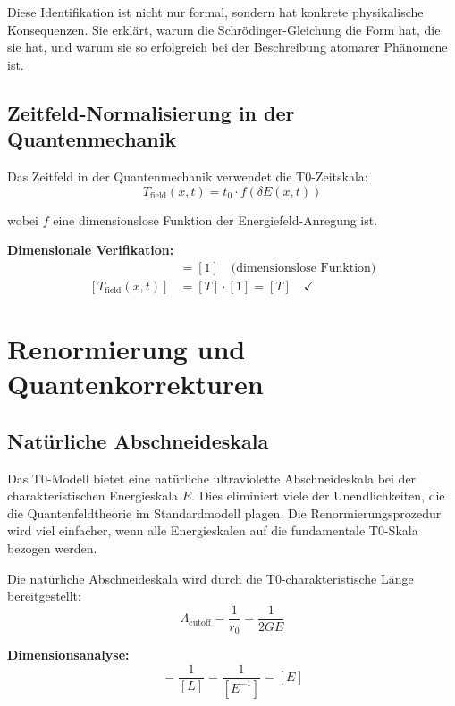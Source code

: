 \documentclass[12pt,a4paper]{report}
\newcommand{\rzero}{r_0}                  %
\newcommand{\tzero}{t_0}                  %
\begin{document}
Diese Identifikation ist nicht nur formal, sondern hat konkrete physikalische Konsequenzen. Sie erklärt, warum die Schrödinger-Gleichung die Form hat, die sie hat, und warum sie so erfolgreich bei der Beschreibung atomarer Phänomene ist.
	\subsection{Zeitfeld-Normalisierung in der Quantenmechanik}
	
	Das Zeitfeld in der Quantenmechanik verwendet die T0-Zeitskala:
	\begin{equation}
		T_{\text{field}}(x,t) = \tzero \cdot f(\delta E(x,t))
	\end{equation}
	
	wobei $f$ eine dimensionslose Funktion der Energiefeld-Anregung ist.
	
	\textbf{Dimensionale Verifikation:}
	\begin{align}
		[f(\delta E(x,t))] &= [1] \quad \text{(dimensionslose Funktion)} \\
		[T_{\text{field}}(x,t)] &= [T] \cdot [1] = [T] \quad \checkmark
	\end{align}
	
	\section{Renormierung und Quantenkorrekturen}
	
	\subsection{Natürliche Abschneideskala}
	
	Das T0-Modell bietet eine natürliche ultraviolette Abschneideskala bei der charakteristischen Energieskala $E$. Dies eliminiert viele der Unendlichkeiten, die die Quantenfeldtheorie im Standardmodell plagen. Die Renormierungsprozedur wird viel einfacher, wenn alle Energieskalen auf die fundamentale T0-Skala bezogen werden.
	
	Die natürliche Abschneideskala wird durch die T0-charakteristische Länge bereitgestellt:
	\begin{equation}
		\Lambda_{\text{cutoff}} = \frac{1}{\rzero} = \frac{1}{2GE}
	\end{equation}
	
	\textbf{Dimensionsanalyse:}
	\begin{equation}
		[\Lambda_{\text{cutoff}}] = \frac{1}{[L]} = \frac{1}{[E^{-1}]} = [E]
	\end{equation}
	
\end{document}
